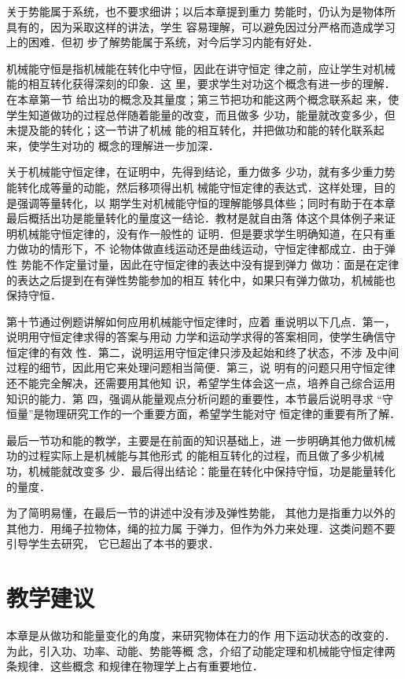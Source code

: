 关于势能属于系统，也不要求细讲；以后本章提到重力
势能时，仍认为是物体所具有的，因为采取这样的讲法，学生
容易理解，可以避免因过分严格而造成学习上的困难．但初
步了解势能属于系统，对今后学习内能有好处．

机械能守恒是指机械能在转化中守恒，因此在讲守恒定
律之前，应让学生对机械能的相互转化获得深刻的印象．这
里，要求学生对功这个概念有进一步的理解．在本章第一节
给出功的概念及其量度；第三节把功和能这两个概念联系起
来，使学生知道做功的过程总伴随着能量的改变，而且做多
少功，能量就改变多少，但未提及能的转化；这一节讲了机械
能的相互转化，并把做功和能的转化联系起来，使学生对功的
概念的理解进一步加深．

关于机械能守恒定律，在证明中，先得到结论，重力做多
少功，就有多少重力势能转化成等量的动能，然后移项得出机
械能守恒定律的表达式．这样处理，目的是强调等量转化，以
期学生对机械能守恒的理解能够具体些；同时有助于在本章
最后概括出功是能量转化的量度这一结论．教材是就自由落
体这个具体例子来证明机械能守恒定律的，没有作一般性的
证明．但是要求学生明确知道，在只有重力做功的情形下，不
论物体做直线运动还是曲线运动，守恒定律都成立．由于弹性
势能不作定量讨量，因此在守恒定律的表达中没有提到弹力
做功：面是在定律的表达之后提到在有弹性势能参加的相互
转化中，如果只有弹力做功，机械能也保持守恒．

第十节通过例题讲解如何应用机械能守恒定律时，应着
重说明以下几点．第一，说明用守恒定律求得的答案与用动
力学和运动学求得的答案相同，使学生确信守恒定律的有效
性．第二，说明运用守恒定律只涉及起始和终了状态，不涉
及中间过程的细节，因此用它来处理问题相当简便．第三，说
明有的问题只用守恒定律还不能完全解决，还需要用其他知
识，希望学生体会这一点，培养自己综合运用知识的能力．第
四，强调从能量观点分析问题的重要性，本节最后说明寻求
“守恒量”是物理研究工作的一个重要方面，希望学生能对守
恒定律的重要有所了解．

最后一节功和能的教学，主要是在前面的知识基础上，进
一步明确其他力做机械功的过程实际上是机械能与其他形式
的能相互转化的过程，而且做了多少机械功，机械能就改变多
少．最后得出结论：能量在转化中保持守恒，功是能量转化
的量度．

为了简明易懂，在最后一节的讲述中没有涉及弹性势能，
其他力是指重力以外的其他力．用绳子拉物体，绳的拉力属
于弹力，但作为外力来处理．这类问题不要引导学生去研究，
它已超出了本书的要求．

\section{教学建议}
本章是从做功和能量变化的角度，来研究物体在力的作
用下运动状态的改变的．为此，引入功、功率、动能、势能等概
念，介绍了动能定理和机械能守恒定律两条规律．这些概念
和规律在物理学上占有重要地位．

